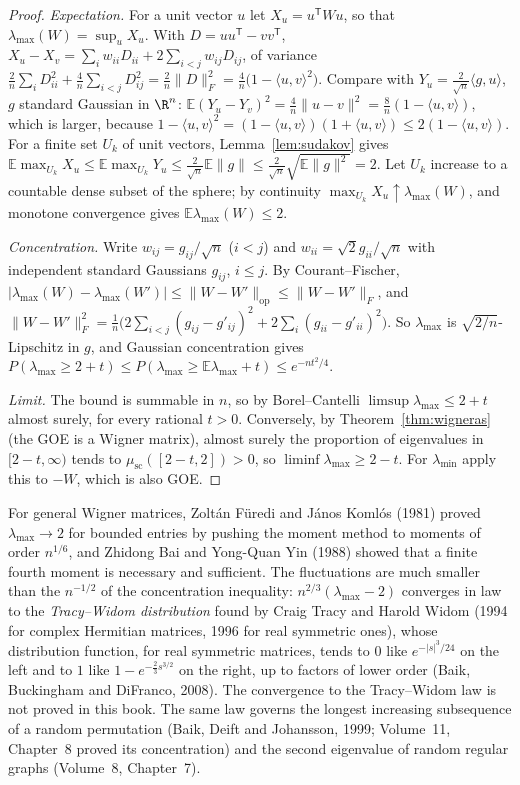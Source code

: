 \begin{proof}
\emph{Expectation.} For a unit vector $u$ let $X_u=u^{\mathsf T}Wu$, so that $\lambda_{\max}(W)=\sup_uX_u$. With $D=uu^{\mathsf T}-vv^{\mathsf T}$, $X_u-X_v=\sum_iw_{ii}D_{ii}+2\sum_{i<j}w_{ij}D_{ij}$, of variance
$\frac2n\sum_iD_{ii}^2+\frac4n\sum_{i<j}D_{ij}^2=\frac2n\|D\|_F^2=\frac4n\bigl(1-\langle u,v\rangle^2\bigr)$. Compare with $Y_u=\frac2{\sqrt n}\langle g,u\rangle$, $g$ standard Gaussian in $\R^n$:
$\mathbb E(Y_u-Y_v)^2=\frac4n\|u-v\|^2=\frac8n(1-\langle u,v\rangle)$, which is larger, because $1-\langle u,v\rangle^2=(1-\langle u,v\rangle)(1+\langle u,v\rangle)\le2(1-\langle u,v\rangle)$. For a finite set $U_k$ of unit vectors,
Lemma~\ref{lem:sudakov} gives $\mathbb E\max_{U_k}X_u\le\mathbb E\max_{U_k}Y_u\le\frac2{\sqrt n}\mathbb E\|g\|\le\frac2{\sqrt n}\sqrt{\mathbb E\|g\|^2}=2$. Let $U_k$ increase to a countable dense subset of the sphere; by continuity
$\max_{U_k}X_u\uparrow\lambda_{\max}(W)$, and monotone convergence gives $\mathbb E\lambda_{\max}(W)\le2$.

\emph{Concentration.} Write $w_{ij}=g_{ij}/\sqrt n$ ($i<j$) and $w_{ii}=\sqrt2g_{ii}/\sqrt n$ with independent standard Gaussians $g_{ij}$, $i\le j$. By Courant--Fischer, $|\lambda_{\max}(W)-\lambda_{\max}(W')|\le\|W-W'\|_{\mathrm{op}}\le\|W-W'\|_F$, and
$\|W-W'\|_F^2=\frac1n\bigl(2\sum_{i<j}(g_{ij}-g'_{ij})^2+2\sum_i(g_{ii}-g'_{ii})^2\bigr)$. So $\lambda_{\max}$ is $\sqrt{2/n}$-Lipschitz in $g$, and Gaussian concentration gives $P(\lambda_{\max}\ge2+t)\le P(\lambda_{\max}\ge\mathbb E\lambda_{\max}+t)\le e^{-nt^2/4}$.

\emph{Limit.} The bound is summable in $n$, so by Borel--Cantelli $\limsup\lambda_{\max}\le2+t$ almost surely, for every rational $t>0$. Conversely, by Theorem~\ref{thm:wigneras} (the GOE is a Wigner matrix), almost surely the
proportion of eigenvalues in $[2-t,\infty)$ tends to $\mu_{\mathrm{sc}}([2-t,2])>0$, so $\liminf\lambda_{\max}\ge2-t$. For $\lambda_{\min}$ apply this to $-W$, which is also GOE.
\end{proof}

\begin{remark}
For general Wigner matrices, Zolt\'an F\"uredi and J\'anos Koml\'os (1981) proved $\lambda_{\max}\to2$ for bounded entries by pushing the moment method to moments of order $n^{1/6}$, and Zhidong Bai and Yong-Quan Yin (1988) showed that a
finite fourth moment is necessary and sufficient. The fluctuations are much smaller than the $n^{-1/2}$ of the concentration inequality: $n^{2/3}(\lambda_{\max}-2)$ converges in law to the \emph{Tracy--Widom distribution} found by
Craig Tracy and Harold Widom (1994 for complex Hermitian matrices, 1996 for real symmetric ones), whose distribution function, for real symmetric matrices, tends to $0$ like $e^{-|s|^3/24}$ on the left and to $1$ like $1-e^{-\frac23s^{3/2}}$ on the right, up to factors of lower order (Baik, Buckingham and DiFranco, 2008). The convergence to the Tracy--Widom law is not proved in this book. The same law governs the longest
increasing subsequence of a random permutation (Baik, Deift and Johansson, 1999; Volume~11, Chapter~8 proved its concentration) and the second eigenvalue of random regular graphs (Volume~8, Chapter~7).
\end{remark}

